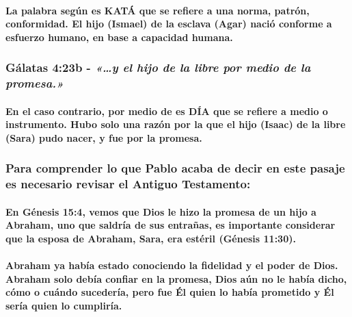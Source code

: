 \documentclass[11a pt,twoside]{article}
\newcommand{\scripture}[1]{%
  {\fontsize{12pt}{16pt}\selectfont\ScriptureFont\itshape #1}%
}
\let\oldsubsubsection\subsubsection
\renewcommand{\subsubsection}{\needspace{4\baselineskip}\oldsubsubsection}
\let\oldparagraph\paragraph
\renewcommand{\paragraph}{\needspace{3\baselineskip}\oldparagraph}
\begin{document}
\paragraph{La palabra según es KATÁ que se refiere a una norma, patrón,
conformidad. El hijo (Ismael) de la esclava (Agar) nació conforme a
esfuerzo humano, en base a capacidad
humana.}\label{la-palabra-seguxfan-es-katuxe1-que-se-refiere-a-una-norma-patruxf3n-conformidad.-el-hijo-ismael-de-la-esclava-agar-naciuxf3-conforme-a-esfuerzo-humano-en-base-a-capacidad-humana.}

\subsubsection{\texorpdfstring{Gálatas 4:23b -
\scripture{«…y el hijo de la libre por medio de la promesa.»}}{Gálatas 4:23b - }}\label{guxe1latas-423b---y-el-hijo-de-la-libre-por-medio-de-la-promesa.}

\paragraph{En el caso contrario, por medio de es DÍA que se refiere a
medio o instrumento. Hubo solo una razón por la que el hijo (Isaac) de
la libre (Sara) pudo nacer, y fue por la
promesa.}\label{en-el-caso-contrario-por-medio-de-es-duxeda-que-se-refiere-a-medio-o-instrumento.-hubo-solo-una-razuxf3n-por-la-que-el-hijo-isaac-de-la-libre-sara-pudo-nacer-y-fue-por-la-promesa.}

\subsubsection{Para comprender lo que Pablo acaba de decir en este
pasaje es necesario revisar el Antiguo
Testamento:}\label{para-comprender-lo-que-pablo-acaba-de-decir-en-este-pasaje-es-necesario-revisar-el-antiguo-testamento}

\paragraph{En Génesis 15:4, vemos que Dios le hizo la promesa de un hijo
a Abraham, uno que saldría de sus entrañas, es importante considerar que
la esposa de Abraham, Sara, era estéril (Génesis
11:30).}\label{en-guxe9nesis-154-vemos-que-dios-le-hizo-la-promesa-de-un-hijo-a-abraham-uno-que-saldruxeda-de-sus-entrauxf1as-es-importante-considerar-que-la-esposa-de-abraham-sara-era-estuxe9ril-guxe9nesis-1130.}

\paragraph{Abraham ya había estado conociendo la fidelidad y el poder de
Dios. Abraham solo debía confiar en la promesa, Dios aún no le había
dicho, cómo o cuándo sucedería, pero fue Él quien lo había prometido y
Él sería quien lo
cumpliría.}\label{abraham-ya-habuxeda-estado-conociendo-la-fidelidad-y-el-poder-de-dios.-abraham-solo-debuxeda-confiar-en-la-promesa-dios-auxfan-no-le-habuxeda-dicho-cuxf3mo-o-cuuxe1ndo-sucederuxeda-pero-fue-uxe9l-quien-lo-habuxeda-prometido-y-uxe9l-seruxeda-quien-lo-cumpliruxeda.}
\end{document}

